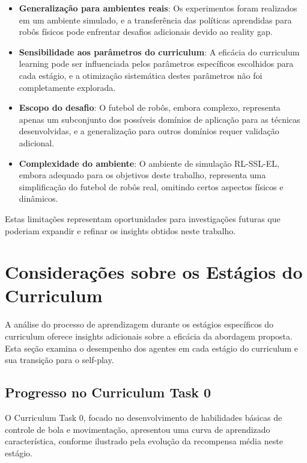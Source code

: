\begin{itemize}
    \item \textbf{Generalização para ambientes reais}: Os experimentos foram realizados em um ambiente simulado, e a transferência das políticas aprendidas para robôs físicos pode enfrentar desafios adicionais devido ao reality gap.
    
    \item \textbf{Sensibilidade aos parâmetros do curriculum}: A eficácia do curriculum learning pode ser influenciada pelos parâmetros específicos escolhidos para cada estágio, e a otimização sistemática destes parâmetros não foi completamente explorada.
    
    \item \textbf{Escopo do desafio}: O futebol de robôs, embora complexo, representa apenas um subconjunto dos possíveis domínios de aplicação para as técnicas desenvolvidas, e a generalização para outros domínios requer validação adicional.
    
    \item \textbf{Complexidade do ambiente}: O ambiente de simulação RL-SSL-EL, embora adequado para os objetivos deste trabalho, representa uma simplificação do futebol de robôs real, omitindo certos aspectos físicos e dinâmicos.
\end{itemize}

Estas limitações representam oportunidades para investigações futuras que poderiam expandir e refinar os insights obtidos neste trabalho.

\section{Considerações sobre os Estágios do Curriculum}
\label{sec:analise_estagios}

A análise do processo de aprendizagem durante os estágios específicos do curriculum oferece insights adicionais sobre a eficácia da abordagem proposta. Esta seção examina o desempenho dos agentes em cada estágio do curriculum e sua transição para o self-play.

\subsection{Progresso no Curriculum Task 0}

O Curriculum Task 0, focado no desenvolvimento de habilidades básicas de controle de bola e movimentação, apresentou uma curva de aprendizado característica, conforme ilustrado pela evolução da recompensa média neste estágio.


